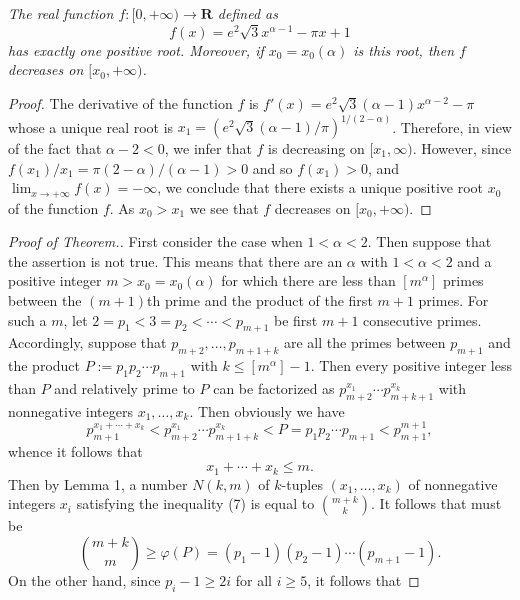 \documentclass[12pt]{amsart}
\begin{document}
{ {\it The real function $f:[0,+\infty)\to {\mathbf R}$
defined as 
$$
f(x)=e^2\sqrt{3}x^{\alpha-1}-\pi x+1
$$ 
has exactly one positive root. Moreover, if $x_0=x_0(\alpha)$ is this root, 
then $f$
decreases on $[x_0,+\infty)$.} 

\begin{proof}
The  derivative of the function $f$ is 
$f'(x)=e^2\sqrt{3}(\alpha-1)x^{\alpha-2}-\pi$ whose a unique real root
is 
$x_1=\left(e^2\sqrt{3}(\alpha -1)/\pi\right)^{1/(2-\alpha)}$.
Therefore, in view of the fact that  $\alpha-2<0$, we infer that
$f$ is decreasing on  $[x_1,\infty)$. However, since 
$f(x_1)/x_1=\pi(2-\alpha)/(\alpha -1)>0$ and so $f(x_1)>0$, 
and $\lim_{x\to +\infty}f(x)=-\infty$, we conclude that there 
exists a unique positive root $x_0$ of the function $f$.
As $x_0>x_1$ we see that $f$ decreases on $[x_0,+\infty)$.  
 \end{proof}
  \begin{proof}[Proof of Theorem.] First  consider the case 
when $1<\alpha <2$. Then suppose that the assertion is not true.
This means that there are  
an $\alpha$  with $1<\alpha <2$ and 
a  positive integer $m>x_0=x_0(\alpha)$ for which 
there are less  than $\left[m^\alpha\right]$ primes between 
the $(m+1)$th prime and the product of the first $m+1$ primes.
For such a $m$, let $2=p_1<3=p_2<\cdots <p_{m+1}$
be first $m+1$ consecutive primes. Accordingly, suppose that 
$p_{m+2},\ldots,p_{m+1+k}$ are all the primes between $p_{m+1}$ and 
the product $P:=p_1p_2\cdots p_{m+1}$ with $k\le \left[m^\alpha\right]-1$. 
Then  every positive integer less than $P$ and relatively prime to $P$ can be 
factorized  as $p_{m+2}^{x_1}\cdots p_{m+k+1}^{x_k}$ with 
nonnegative integers $x_1,\ldots ,x_k$. Then obviously
we have 
  \begin{equation*}
p_{m+1}^{x_1+\cdots +x_k}<p_{m+2}^{x_1}\cdots p_{m+1+k}^{x_k}<P=
p_1p_2\cdots p_{m+1}< p_{m+1}^{m+1},
  \end{equation*}
whence it follows that 
 \begin{equation}
x_1+\cdots +x_k\le m.
  \end{equation}
Then by Lemma 1, a number $N(k, m)$ of $k$-tuples  
$(x_1,\ldots,x_k)$ of nonnegative integers $x_i$
satisfying the inequality (7) is equal to ${m+k\choose k}$. 
It follows that must be 
   \begin{equation}
{m+k\choose m}\ge 
\varphi(P)=(p_1-1)(p_2-1)\cdots (p_{m+1}-1).
  \end{equation}
On the other hand, since  $p_i-1\ge 2i$ for all $i\ge 5$, it follows that  

\end{proof}}
\end{document}
